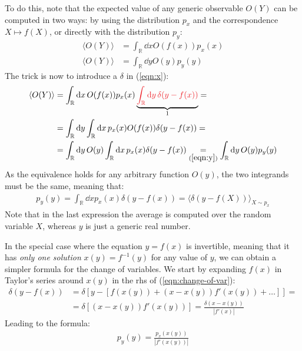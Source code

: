 \documentclass[../../main.tex]{subfiles}
\begin{document}
To do this, note that the expected value of any generic observable $O(Y)$ can be computed in two ways: by using the distribution $p_x$ and the correspondence $X \mapsto f(X)$, or directly with the distribution $p_y$:
\begin{subequations}
    \begin{align} \label{eqn:x}
        \langle O(Y) \rangle &= \int_{\mathbb{R}} \dd{x} O(f(x)) p_x(x)\\
        \langle O(Y) \rangle &= \int_{\mathbb{R}} \dd{y} O(y) p_y(y)\label{eqn:y}
    \end{align}
\end{subequations}
The trick is now to introduce a $\delta$ in (\ref{eqn:x}):
\begin{align*}
    \langle O(Y) \rangle &= \int_{\mathbb{R}} \dd{x} O(f(x))p_x(x) \underbrace{\textcolor{Red}{\int_{\mathbb{R}} \dd{y} \delta(y-f(x))}}_{1} =\\
    &= \int_{\mathbb{R}} \dd{y} \int_{\mathbb{R}} \dd{x} p_x(x) O(f(x)) \delta(y-f(x)) =\\
    &= \int_{\mathbb{R}} \dd{y} O(y) \int_{\mathbb{R}} \dd{x} p_x(x) \delta(y-f(x)) \underset{(\ref{eqn:y})}{=} \int_{\mathbb{R}} \dd{y} O(y) p_y(y)
\end{align*}
As the equivalence holds for any arbitrary function $O(y)$, the two integrands must be the same, meaning that:
\begin{align} \label{eqn:change-of-var}
    p_y(y) = \int_{\mathbb{R}} \dd{x} p_x(x) \delta(y-f(x)) = \langle \delta(y-f(X)) \rangle_{X \sim p_x}
\end{align}
Note that in the last expression the average is computed over the random variable $X$, whereas $y$ is just a generic real number.

\medskip

In the special case where the equation $y=f(x)$ is invertible, meaning that it has \textit{only one solution} $x(y) = f^{-1}(y)$ for any value of $y$, we can obtain a simpler formula for the change of variables. We start by expanding $f(x)$ in Taylor's series around $x(y)$ in the rhs of (\ref{eqn:change-of-var}):
\begin{align*}
    \delta(y-f(x)) &= \delta[y-[f(x(y)) + (x-x(y))f'(x(y)) + \dots]] =\\
    &= \delta[(x-x(y)) f'(x(y))] = \frac{\delta(x-x(y))}{|f'(x)|} 
\end{align*}
Leading to the formula:
\begin{align} \label{eqn:change-of-var-special}
    p_y(y) = \frac{p_x(x(y))}{|f'(x(y))|} 
\end{align}
\end{document}
